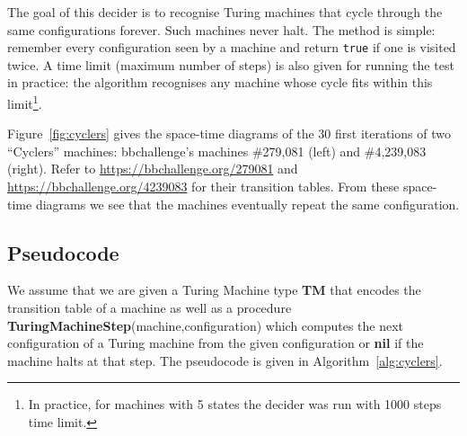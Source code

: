 The goal of this decider is to recognise Turing machines that cycle through the same configurations forever. Such machines never halt. The method is simple: remember every configuration seen by a machine and return \texttt{true} if one is visited twice. A time limit (maximum number of steps) is also given for running the test in practice: the algorithm recognises any machine whose cycle fits within this limit\footnote{In practice, for machines with 5 states the decider was run with 1000 steps time limit.}.


\begin{example}\normalfont
  Figure~\ref{fig:cyclers} gives the space-time diagrams of the 30 first iterations of two ``Cyclers'' machines: bbchallenge's machines \#279,081 (left) and \#4,239,083 (right). Refer to \url{https://bbchallenge.org/279081} and
  \url{https://bbchallenge.org/4239083} for their transition tables. From these space-time diagrams we see that the machines eventually repeat the same configuration.
\end{example}

\subsection{Pseudocode}

We assume that we are given a Turing Machine type \textbf{TM} that encodes the transition table of a machine as well as a procedure \textbf{TuringMachineStep}(machine,configuration) which computes the next configuration of a Turing machine from the given configuration or \textbf{nil} if the machine halts at that step. The pseudocode is given in Algorithm~\ref{alg:cyclers}.

